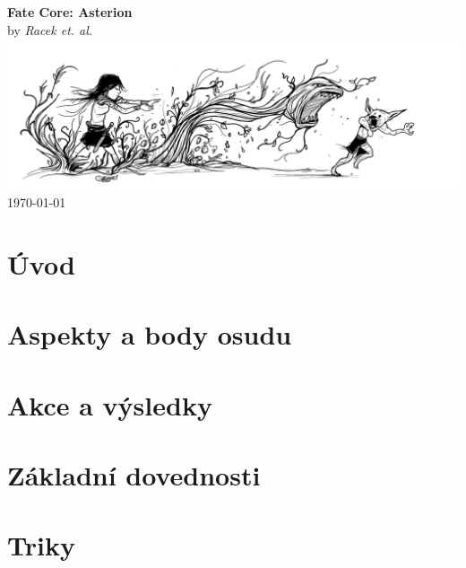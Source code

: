 \documentclass[12pt,a4paper,twoside,openany]{book}
\newcommand{\booktitle}{Fate Core: Asterion}
\newcommand{\authorname}{Racek et. al. }
\begin{document}
\begin{titlepage}
    \centering
    {\Huge\textbf{\booktitle}}\\[1.5cm]
    {\Large by \textit{\authorname}}\\[2cm]
    \includegraphics[width=\textwidth]{logo}\\[2cm]
    \vfill
    {\large \today}
\end{titlepage}

\frontmatter  %

\tableofcontents

\mainmatter   %
\setlength{\columnsep}{1cm}  %

\chapter{Úvod}
\label{chap:introduction}


\chapter{Aspekty a body osudu}
\label{chap:aspekty}


\chapter{Akce a výsledky}
\label{chap:akce}


\chapter{Základní dovednosti}
\label{chap:dovednosti}


\chapter{Triky}
\label{chap:triky}

\end{document}
